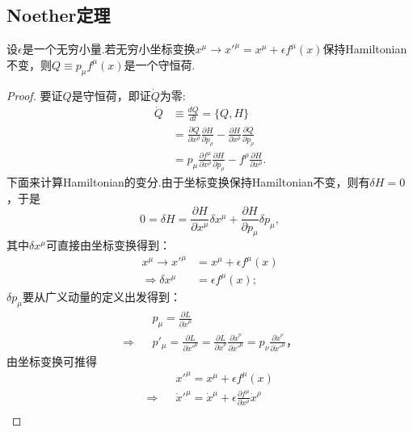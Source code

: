 	\subsection{Noether定理}
		\begin{theorem}
		设$\epsilon$是一个无穷小量.若无穷小坐标变换$x^\mu\rightarrow x'^\mu=x^\mu+\epsilon f^\mu(x)$保持Hamiltonian不变，则$Q\equiv p_\mu f^\mu(x)$是一个守恒荷.
		\end{theorem}
		\begin{proof}
		要证$Q$是守恒荷，即证$\dot{Q}$为零:
		\begin{equation*}
			\begin{split}
				\dot{Q}&\equiv\frac{dQ}{dt}=\{Q,H\}\\
				&=\frac{\partial Q}{\partial x^\rho}\frac{\partial H}{\partial p_\rho}-\frac{\partial H}{\partial x^\rho}\frac{\partial Q}{\partial p_\rho}\\
				&=p_\mu \frac{\partial f^\mu}{\partial x^\rho}\frac{\partial H}{\partial p_\rho}-f^\rho\frac{\partial H}{\partial x^\rho}.
			\end{split}
		\end{equation*}
		下面来计算Hamiltonian的变分.由于坐标变换保持Hamiltonian不变，则有$\delta H=0$，于是
		\begin{equation}\label{pr:delta H}
			0=\delta H=\frac{\partial H}{\partial x^\mu}\delta x^\mu+\frac{\partial H}{\partial p_\mu}\delta p_\mu,
		\end{equation}
		其中$\delta x^\mu$可直接由坐标变换得到：
		\begin{equation}\label{pr:delta x}
			\begin{split}
				x^\mu\rightarrow x'^\mu&=x^\mu+\epsilon f^\mu(x)\\
				\Rightarrow\delta x^\mu&=\epsilon f^\mu(x);
			\end{split}
		\end{equation}
		$\delta p_\mu$要从广义动量的定义出发得到：
		\begin{eqnarray*}
			&&p_\mu=\frac{\partial L}{\partial \dot{x}^\mu}\\
			\Rightarrow &&p'_\mu=\frac{\partial L}{\partial \dot{x}'^\mu}=\frac{\partial L}{\partial \dot{x}^\nu}\frac{\partial \dot{x}^\nu}{\partial \dot{x}'^\mu}=p_\nu\frac{\partial \dot{x}^\nu}{\partial \dot{x}'^\mu}，
		\end{eqnarray*}
		由坐标变换可推得
		\begin{eqnarray*}
			&&x'^\mu=x^\mu+\epsilon f^\mu(x)\\
			\Rightarrow&&\dot{x}'^\mu=\dot{x}^\mu+\epsilon \frac{\partial f^\mu}{\partial x^\rho}\dot{x}^\rho\\

\end{eqnarray*}
\end{proof}
